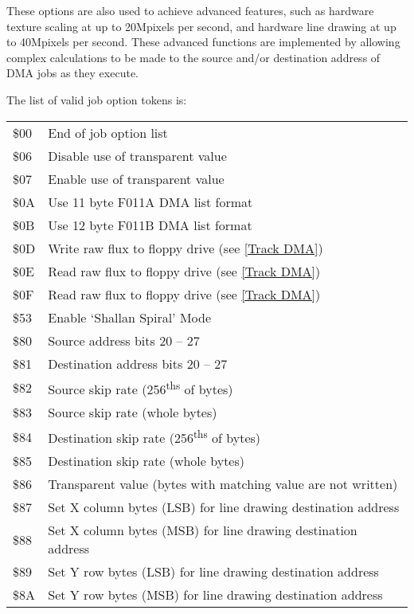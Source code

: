 These options are also used to achieve advanced features, such as hardware
texture scaling at up to 20Mpixels per second, and hardware line drawing
at up to 40Mpixels per second. These advanced functions are implemented
by allowing complex calculations to be made to the source and/or destination
address of DMA jobs as they execute.

The list of valid job option tokens is:

\begin{center}
\begin{tabular}{|>{\centering\arraybackslash}p{1.5cm}|p{10cm}|}
  \hline
  \$00 & End of job option list \\
  \$06 & Disable use of transparent value \\
  \$07 & Enable use of transparent value \\
  \$0A & Use 11 byte F011A DMA list format \\
  \$0B & Use 12 byte F011B DMA list format \\
  \$0D & Write raw flux to floppy drive (see \ref{Track DMA}) \\
  \$0E & Read raw flux to floppy drive (see \ref{Track DMA}) \\
  \$0F & Read raw flux to floppy drive (see \ref{Track DMA}) \\
  \$53 & Enable `Shallan Spiral' Mode \\
  \$80 & Source address bits 20 -- 27 \\
  \$81 & Destination address bits 20 -- 27 \\
  \$82 & Source skip rate (256\textsuperscript{ths} of bytes) \\
  \$83 & Source skip rate (whole bytes) \\
  \$84 & Destination skip rate (256\textsuperscript{ths} of bytes) \\
  \$85 & Destination skip rate (whole bytes) \\
  \$86 & Transparent value (bytes with matching value are not written) \\
  \$87 & Set X column bytes (LSB) for line drawing destination address \\
  \$88 & Set X column bytes (MSB) for line drawing destination address \\
  \$89 & Set Y row bytes (LSB) for line drawing destination address \\
  \$8A & Set Y row bytes (MSB) for line drawing destination address \\

\end{tabular}
\end{center}
